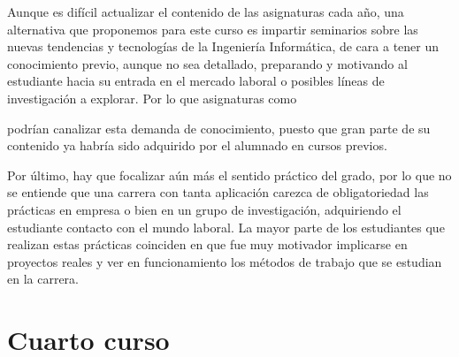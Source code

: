 Aunque es difícil actualizar el contenido de las asignaturas cada año,
una alternativa que proponemos para este curso es
impartir seminarios sobre las nuevas tendencias y tecnologías
de la Ingeniería Informática,
de cara a tener un conocimiento previo, aunque no sea detallado,
preparando y motivando al estudiante hacia su entrada en el mercado laboral o
posibles líneas de investigación a explorar.
Por lo que asignaturas como
\subject{Tecnologías Específicas de la Ingeniería Informática (TEII)}
podrían canalizar esta demanda de conocimiento,
puesto que gran parte de su contenido ya habría sido adquirido
por el alumnado en cursos previos.

Por último, hay que focalizar aún más el sentido práctico del grado,
por lo que no se entiende que una carrera con tanta aplicación
carezca de obligatoriedad las prácticas en empresa
o bien en un grupo de investigación,
adquiriendo el estudiante contacto con el mundo laboral.
La mayor parte de los estudiantes que realizan estas prácticas coinciden en que
fue muy motivador implicarse en proyectos reales y
ver en funcionamiento los métodos de trabajo que se estudian en la carrera.

\section{Cuarto curso}

